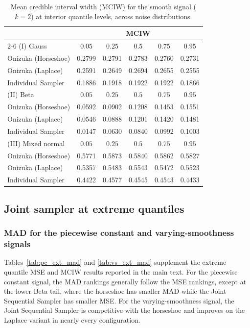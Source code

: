 \begin{table}[htbp]
\centering
\caption{Mean credible interval width (MCIW) for the smooth signal ($k=2$) at interior quantile levels, across noise distributions.}
\label{tab:s_int_mciw}
\begin{tabular}{lccccc}
\toprule
& \multicolumn{5}{c}{MCIW} \\
\cmidrule(lr){2-6}
(I) Gauss & $0.05$ & $0.25$ & $0.5$ & $0.75$ & $0.95$ \\
\midrule
Onizuka (Horseshoe) & 0.2799 & 0.2791 & 0.2783 & 0.2760 & 0.2731 \\
Onizuka (Laplace)   & 0.2591 & 0.2649 & 0.2694 & 0.2655 & 0.2555 \\
Individual Sampler  & 0.1886 & 0.1918 & 0.1922 & 0.1922 & 0.1866 \\
\midrule
(II) Beta & $0.05$ & $0.25$ & $0.5$ & $0.75$ & $0.95$ \\
\midrule
Onizuka (Horseshoe) & 0.0592 & 0.0902 & 0.1208 & 0.1453 & 0.1551 \\
Onizuka (Laplace)   & 0.0546 & 0.0888 & 0.1201 & 0.1420 & 0.1481 \\
Individual Sampler  & 0.0147 & 0.0630 & 0.0840 & 0.0992 & 0.1003 \\
\midrule
(III) Mixed normal & $0.05$ & $0.25$ & $0.5$ & $0.75$ & $0.95$ \\
\midrule
Onizuka (Horseshoe) & 0.5771 & 0.5873 & 0.5840 & 0.5862 & 0.5827 \\
Onizuka (Laplace)   & 0.5357 & 0.5483 & 0.5543 & 0.5472 & 0.5523 \\
Individual Sampler  & 0.4422 & 0.4577 & 0.4545 & 0.4543 & 0.4433 \\
\bottomrule
\end{tabular}
\end{table}

\clearpage
\subsection{Joint sampler at extreme quantiles}
\label{app:sim:joint}

\subsubsection{MAD for the piecewise constant and varying-smoothness signals}

Tables~\ref{tab:pc_ext_mad} and \ref{tab:vs_ext_mad} supplement the extreme
quantile MSE and MCIW results reported in the main text.  For the piecewise
constant signal, the MAD rankings generally follow the MSE rankings, except
at the lower Beta tail, where the horseshoe has smaller MAD while the Joint
Sequential Sampler has smaller MSE.  For the varying-smoothness signal, the
Joint Sequential Sampler is competitive with the horseshoe and improves on
the Laplace variant in nearly every configuration.

